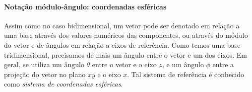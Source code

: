 \paragraph{Notação módulo-ângulo: coordenadas esféricas}

Assim como no caso bidimensional, um vetor pode ser denotado em relação a uma base através dos valores numéricos das componentes, ou através do módulo do vetor e de ângulos em relação a eixos de referência. Como temos uma base tridimensional, precisamos de mais um ângulo entre o vetor e um dos eixos. Em geral, se utiliza um ângulo  $\theta$ entre o vetor e o eixo $z$, e um ângulo $\phi$ entre a projeção do vetor no plano $xy$ e o eixo $x$. Tal sistema de referência é conhecido como \emph{sistema de coordenadas esféricas}.


